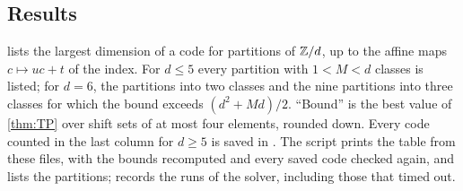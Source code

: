 \subsection{Results}

 lists the largest dimension of a code for partitions of $\mathbb{Z}/d$, up to the affine maps
$c\mapsto uc+t$ of the index. For $d\le5$ every partition with $1<M<d$ classes is listed; for $d=6$, the partitions
into two classes and the nine partitions into three classes for which the bound exceeds $(d^2+Md)/2$. ``Bound'' is the best value of \cref{thm:TP} over shift sets
of at most four elements, rounded down. Every code counted in the last column for $d\ge5$ is saved in
. The script  prints the table from these files, with the bounds
recomputed and every saved code checked again, and lists the partitions;  records the runs
of the solver, including those that timed out.

